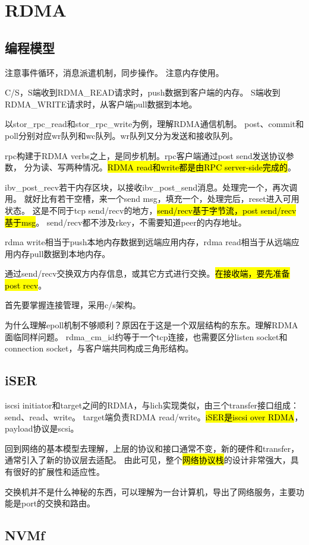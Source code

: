 \chapter{RDMA}

\section{编程模型}

注意事件循环，消息派遣机制，同步操作。
注意内存使用。

C/S，S端收到RDMA\_READ请求时，push数据到客户端的内存。
S端收到RDMA\_WRITE请求时，从客户端pull数据到本地。

以stor\_rpc\_read和stor\_rpc\_write为例，理解RDMA通信机制。
post、commit和poll分别对应wr队列和wc队列。wr队列又分为发送和接收队列。

rpc构建于RDMA verbs之上，是同步机制。rpc客户端通过post send发送协议参数，
分为读、写两种情况。\hl{RDMA read和write都是由RPC server-side完成的}。

ibv\_post\_recv若干内存区块，以接收ibv\_post\_send消息。处理完一个，再次调用。
就好比有若干空槽，来一个send msg，填充一个，处理完后，reset进入可用状态。
这是不同于tcp send/recv的地方，\hl{send/recv基于字节流，post send/recv基于msg}。
send/recv都不涉及rkey，不需要知道peer的内存地址。

rdma write相当于push本地内存数据到远端应用内存，rdma read相当于从远端应用内存pull数据到本地内存。

通过send/recv交换双方内存信息，或其它方式进行交换。\hl{在接收端，要先准备post recv}。

首先要掌握连接管理，采用c/s架构。

为什么理解epoll机制不够顺利？原因在于这是一个双层结构的东东。理解RDMA面临同样问题。
rdma\_cm\_id约等于一个tcp连接，也需要区分listen socket和connection socket，与客户端共同构成三角形结构。

\section{iSER}

iscsi initiator和target之间的RDMA，与lich实现类似，由三个transfer接口组成：send、read、write。
target端负责RDMA read/write。\hl{iSER是iscsi over RDMA}，payload协议是scsi。

回到网络的基本模型去理解，上层的协议和接口通常不变，新的硬件和transfer，通常引入了新的协议层去适配。
由此可见，整个\hl{网络协议栈}的设计非常强大，具有很好的扩展性和适应性。

交换机并不是什么神秘的东西，可以理解为一台计算机，导出了网络服务，主要功能是port的交换和路由。

\section{NVMf}

